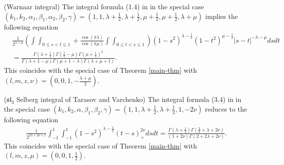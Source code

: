 \documentclass{svjour3}
\newcommand{\comma}{{,}}
\begin{document}
\begin{example}
  \label{ex:2}(Warnaar integral) The integral formula (1.4) in
  {\cite{warnaar2010sl3}} in the special case $(k_1, k_2, \alpha_1, \beta_1,
  \alpha_2 \comma \beta_2, \gamma) = \left( 1, 1, \lambda + \frac{1}{2},
  \lambda + \frac{1}{2}, \mu + \frac{1}{2}, \mu + \frac{1}{2} \comma \lambda +
  \mu \right)$ implies the following equation
  \begin{eqnarray}
    & \frac{1}{2^{\lambda + \mu}} \left( \int \int_{0 \leqslant s < t
    \leqslant 1} + \frac{\cos (\pi \lambda)}{\cos (\pi \mu)} \int \int_{0
    \leqslant t < s \leqslant 1} \right) (1 - s^2)^{\lambda - \frac{1}{2}} (1
    - t^2)^{\mu - \frac{1}{2}} | s - t |^{- \lambda - \mu} d s d t & 
    \nonumber\\
    & = \frac{\Gamma \left( \lambda + \frac{1}{2} \right) \Gamma \left(
    \frac{1}{2} - \mu \right) \Gamma \left( \mu + \frac{1}{2}
    \right)^2}{\Gamma (\lambda + 1 - \mu) \Gamma (\mu + 1 - \lambda) \Gamma
    (\lambda + \mu + 1)} . &  \nonumber
  \end{eqnarray}
  This coincides with the special case of Theorem \ref{main-thm} with $(l, m,
  z, \nu) = \left( 0, 0, 1, - \frac{\lambda + \mu}{2} \right)$.
\end{example}

\begin{example}
  \label{ex:3}($\mathfrak{s}\mathfrak{l}_3$ Selberg integral of Tarasov and
  Varchenko) The integral formula (3.4) in {\cite{tarasov2003selberg}} in the
  special case $(k_1, k_2, \alpha, \beta_1, \beta_2, \gamma) = \left( 1, 1,
  \lambda + \frac{1}{2}, \lambda + \frac{1}{2}, 1, - 2 \nu \right)$ reduces to
  the following equation
  \begin{eqnarray}
    & \frac{1}{2^{2 \lambda + 2 \nu + 1}} \int_{- 1}^1 \int_{- 1}^1 (1 -
    s^2)^{\lambda - \frac{1}{2}} (t - s)_+^{2 \nu} d s d t = \frac{\Gamma
    \left( \lambda + \frac{1}{2} \right) \Gamma \left( \frac{3}{2} + \lambda +
    2 \nu \right)}{(1 + 2 \nu) \Gamma (2 + 2 \lambda + 2 \nu)} . &  \nonumber
  \end{eqnarray}
  This coincides with the special case of Theorem \ref{main-thm} with $(l, m,
  z, \mu) = \left( 0, 0, 1, \frac{1}{2} \right)$.
\end{example}
\end{document}
